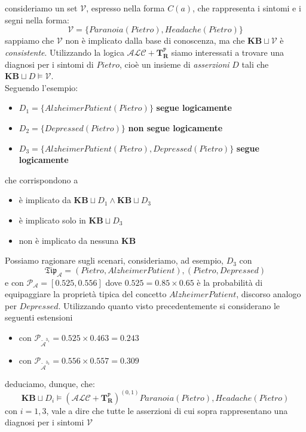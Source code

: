 consideriamo un set $ \mathcal{V} $, espresso nella forma $ C(a) $, che rappresenta i sintomi e i segni nella forma:
\[ \mathcal{V} = \{ Paranoia(Pietro), Headache(Pietro) \} \]
sappiamo che  $ \mathcal{V} $ non è implicato dalla base di conoscenza, ma che $ \textbf{KB} \sqcup \mathcal{V} $ è \textit{consistente}.
Utilizzando la  logica $ \mathcal{ALC} + \mathbf{T}_{\mathbf{R}}^{\mathtt{P}} $ siamo interessati a trovare 
una diagnosi per i sintomi di $ Pietro $, cioè un insieme di \textit{asserzioni} $ D $ tali che $ \textbf{KB} \sqcup D \models \mathcal{V} $.\\
Seguendo l'esempio:
\begin{itemize}
	\item $ D_1 = \{AlzheimerPatient(Pietro)\} $ \textbf{segue logicamente}
	\item $ D_2 = \{Depressed(Pietro)\} $ \textbf{non segue logicamente}
	\item $ D_3 = \{AlzheimerPatient(Pietro), Depressed(Pietro)\} $ \textbf{segue logicamente}
\end{itemize}
che corrispondono a
\begin{itemize}
	\item {} è implicato da $ \textbf{KB} \sqcup D_1 \land \textbf{KB} \sqcup D_3 $
	\item {} è implicato solo in $ \textbf{KB} \sqcup D_3 $
	\item {} non è implicato da nessuna \textbf{KB}
\end{itemize}
Possiamo ragionare sugli scenari, consideriamo, ad esempio, $ D_3 $ con 
\[ \mathfrak{Tip}_{\mathcal{A}} = {(Pietro,AlzheimerPatient), (Pietro,Depressed)} \] 
e con $ \mathcal{P_{A}} = [0.525,0.556] $ dove $ 0.525 = 0.85 \times 0.65 $ è la probabilità di equipaggiare
la proprietà tipica del concetto $ AlzheimerPatient $, discorso analogo per $ Depressed $.
Utilizzando quanto visto precedentemente si considerano le seguenti estensioni
\begin{itemize}
	\item {} 
		con $ \mathcal{P_{\widetilde{A}^\mathit{3_1}}} =  0.525 \times 0.463 = 0.243 $
	\item {}
		con $ \mathcal{P_{\widetilde{A}^\mathit{3_3}}} = 0.556 \times 0.557 = 0.309  $
\end{itemize}
deduciamo, dunque, che:
\[ \textbf{KB} \sqcup D_i \models (\mathcal{ALC} + \mathbf{T}_{\mathbf{R}}^{\mathtt{P}}) ^{(0,1)} Paranoia(Pietro), Headache(Pietro) \]
con $ i = 1,3 $, vale a dire che tutte le asserzioni di cui sopra rappresentano una diagnosi per i sintomi $ \mathcal{V} $

